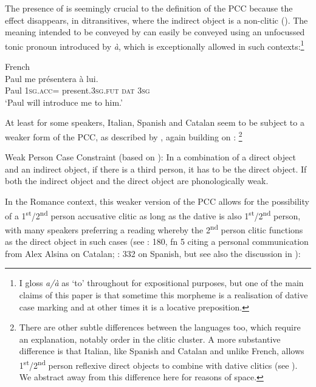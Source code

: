 \documentclass[output=paper,colorlinks,citecolor=brown,nonflat]{langsci/langscibook}
\begin{document}
The presence of  is seemingly crucial to the definition of the PCC because the effect disappears, in ditransitives, where the indirect object is a non-clitic (\citealt{Kayne1975, Rezac2008}). The meaning intended to be conveyed by  can easily be conveyed using an unfocussed tonic pronoun introduced by \textit{à}, which is exceptionally allowed in such contexts:\footnote{I gloss \textit{a/à} as ‘to’ throughout for expositional purposes, but one of the main claims of this paper is that sometime this morpheme is a realisation of dative case marking and at other times it is a locative preposition.}

\ea%
    \label{ex:sheehan:3}
    French \citep[174]{Kayne1975}\\
    \gll    Paul   me     présentera     à   lui.\\
            Paul  \textsc{1sg}.\textsc{acc}=  present.\textsc{3sg.fut}   \textsc{dat}   \textsc{3sg}\\
    \glt    ‘Paul will introduce me to him.’
\z

At least for some speakers, Italian, Spanish and Catalan seem to be subject to a weaker form of the PCC, as described by \citet{Bonet1991}, again building on \citet{Perlmutter1971}:\textstyleFootnoteSymbol{} \footnote{There are other subtle differences between the languages too, which require an explanation, notably order in the clitic cluster. A more substantive difference is that Italian, like Spanish and Catalan and unlike French, allows 1\textsuperscript{st}/2\textsuperscript{nd} person reflexive direct objects to combine with dative clitics (see \citealt{Kayne1975, Bianchi2006}). We abstract away from this difference here for reasons of space.}

\ea%
    \label{ex:sheehan:4}
    Weak Person Case Constraint (based on \citealt[181--182]{Bonet1991}):
    \ea\label{ex:sheehan:4a}
    In a combination of a direct object and an indirect object, if there is a third person, it has to be the direct object.
    \ex\label{ex:sheehan:4b}
    If both the indirect object and the direct object are phonologically weak.
    \z
\z

In the Romance context, this weaker version of the PCC allows for the possibility of a 1\textsuperscript{st}/2\textsuperscript{nd} person accusative clitic as long as the dative is also 1\textsuperscript{st}/2\textsuperscript{nd} person, with many speakers preferring a reading whereby the 2\textsuperscript{nd} person clitic functions as the direct object in such cases (see \citealt{Bonet1991}: 180, fn 5 citing a personal communication from Alex Alsina on Catalan; \citealt{OrmazabalRomero2010}: 332 on Spanish, but see also the discussion in \citealt{Bonet2007}):
\end{document}
